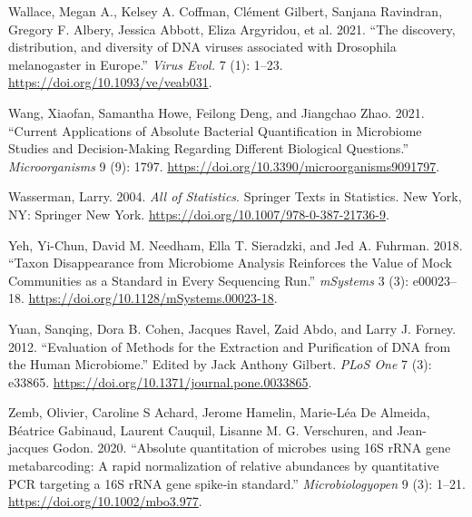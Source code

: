 \documentclass[
]{article}
\newlength{\cslhangindent}
\newlength{\cslentryspacingunit} %
\newenvironment{CSLReferences}[2] %
 {%
  \setlength{\parindent}{0pt}
  \ifodd #1
  \let\oldpar\par
  \def\par{\hangindent=\cslhangindent\oldpar}
  \fi
  \setlength{\parskip}{#2\cslentryspacingunit}
 }%
 {}
\begin{document}
\begin{CSLReferences}{1}{0}
\leavevmode{}%
Wallace, Megan A., Kelsey A. Coffman, Clément Gilbert, Sanjana Ravindran, Gregory F. Albery, Jessica Abbott, Eliza Argyridou, et al. 2021. {``{The discovery, distribution, and diversity of DNA viruses associated with Drosophila melanogaster in Europe}.''} \emph{Virus Evol.} 7 (1): 1--23. \url{https://doi.org/10.1093/ve/veab031}.

\leavevmode{}%
Wang, Xiaofan, Samantha Howe, Feilong Deng, and Jiangchao Zhao. 2021. {``{Current Applications of Absolute Bacterial Quantification in Microbiome Studies and Decision-Making Regarding Different Biological Questions}.''} \emph{Microorganisms} 9 (9): 1797. \url{https://doi.org/10.3390/microorganisms9091797}.

\leavevmode{}%
Wasserman, Larry. 2004. \emph{{All of Statistics}}. Springer Texts in Statistics. New York, NY: Springer New York. \url{https://doi.org/10.1007/978-0-387-21736-9}.

\leavevmode{}%
Yeh, Yi-Chun, David M. Needham, Ella T. Sieradzki, and Jed A. Fuhrman. 2018. {``{Taxon Disappearance from Microbiome Analysis Reinforces the Value of Mock Communities as a Standard in Every Sequencing Run}.''} \emph{mSystems} 3 (3): e00023--18. \url{https://doi.org/10.1128/mSystems.00023-18}.

\leavevmode{}%
Yuan, Sanqing, Dora B. Cohen, Jacques Ravel, Zaid Abdo, and Larry J. Forney. 2012. {``{Evaluation of Methods for the Extraction and Purification of DNA from the Human Microbiome}.''} Edited by Jack Anthony Gilbert. \emph{PLoS One} 7 (3): e33865. \url{https://doi.org/10.1371/journal.pone.0033865}.

\leavevmode{}%
Zemb, Olivier, Caroline S Achard, Jerome Hamelin, Marie‐Léa De Almeida, Béatrice Gabinaud, Laurent Cauquil, Lisanne M. G. Verschuren, and Jean-jacques Godon. 2020. {``{Absolute quantitation of microbes using 16S rRNA gene metabarcoding: A rapid normalization of relative abundances by quantitative PCR targeting a 16S rRNA gene spike‐in standard}.''} \emph{Microbiologyopen} 9 (3): 1--21. \url{https://doi.org/10.1002/mbo3.977}.

\end{CSLReferences}
\end{document}
